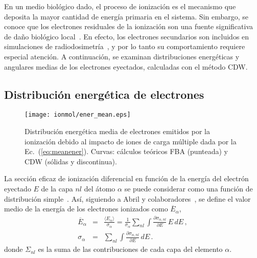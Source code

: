 En un medio biológico dado, el proceso de ionización es el mecanismo que 
deposita la mayor cantidad de energía primaria en el sistema. Sin 
embargo, se conoce que los electrones residuales de la ionización son 
una fuente significativa de daño biológico local~\cite{Denifl:11}. En 
efecto, los electrones secundarios son incluidos en simulaciones de 
radiodosimetría~\cite{Champion:15,Quinto:17,Acocer-Avila:19}, y por lo 
tanto su comportamiento requiere especial atención. A continuación, se
examinan distribuciones energéticas y angulares medias de los electrones 
eyectados, calculadas con el método CDW.

\subsection{Distribución energética de electrones}
\label{subsec:meanener}

\begin{figure}
\centering
\texttt{[image: ionmol/ener\_mean.eps]}
\caption[Distribución energética media de electrones emitidos.]
{Distribución energética media de electrones emitidos por la ionización 
debido al impacto de iones de carga múltiple dada por la 
Ec.~(\ref{eq:meanener}). Curvas: cálculos teóricos FBA (punteada) y CDW 
(sólidas y discontinua).}
\label{fig:emittedener}
\end{figure} 

La sección eficaz de ionización diferencial en función de la energía del 
electrón eyectado $E$ de la capa $nl$ del átomo $\alpha$ se puede 
considerar como una función de distribución simple~\cite{Surdutovic:18}. 
Así, siguiendo 
a Abril y colaboradores~\cite{Abril:15}, se define el valor medio de la 
energía de los electrones ionizados como
$\overline{E}_{\alpha}$, 
\begin{eqnarray}
\overline{E}_{\alpha} &=&\frac{\langle E_{\alpha}\rangle}{\sigma_{\alpha}}
=\frac{1}{\sigma_{\alpha}}\sum_{nl}\int\frac{\partial\sigma_{\alpha,nl}}{
\partial E}\,E\,dE\,, 
\label{eq:meanener} \\
\sigma_{\alpha}&=&\sum_{nl}\int\frac{\partial\sigma_{\alpha,nl}}{
\partial E}\,dE\,. 
\label{eq:normener}
\end{eqnarray}
donde $\Sigma_{nl}$ es la suma de las contribuciones de cada capa del 
elemento $\alpha$.

